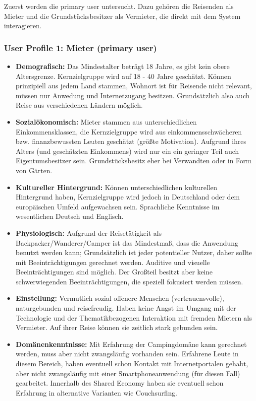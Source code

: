 Zuerst werden die primary user untersucht. Dazu gehören die Reisenden als Mieter und die Grundstücksbesitzer als Vermieter, die direkt mit dem System interagieren.

\newpage
\subsubsection{User Profile 1: Mieter (primary user)}
\begin{itemize}
   \item 
   \textbf{Demografisch:} Das Mindestalter beträgt 18 Jahre, es gibt kein obere Altersgrenze. Kernzielgruppe wird auf 18 - 40 Jahre geschätzt. Können prinzipiell aus jedem Land stammen, Wohnort ist für Reisende nicht relevant, müssen nur Anwedung und Internetzugang besitzen. Grundsätzlich also auch Reise aus verschiedenen Ländern möglich.

   \item 
  \textbf{Sozialökonomisch:} Mieter stammen aus unterschiedlichen Einkommensklassen, die Kernzielgruppe wird aus einkommensschwächeren bzw. finanzbewussten Leuten geschätzt (größte Motivation). 
   Aufgrund ihres Alters (und geschätzten Einkommens) wird nur ein ein geringer Teil auch Eigentumsbesitzer sein. Grundstücksbesitz eher bei Verwandten oder in Form von Gärten.

   \item 
   \textbf{Kultureller Hintergrund:} Können unterschiedlichen kulturellen Hintergrund haben, Kernzielgruppe wird jedoch in Deutschland oder dem europäischen Umfeld aufgewachsen sein. Sprachliche Kenntnisse im wesentlichen Deutsch und Englisch.

   \item
  \textbf{Physiologisch:} Aufgrund der Reisetätigkeit als Backpacker/Wanderer/Camper ist das Mindestmaß, dass die Anwendung benutzt werden kann; Grundsätzlich ist jeder potentieller Nutzer, daher sollte mit Beeinträchtigungen gerechnet werden. Auditive und visuelle Beeinträchtigungen sind möglich. Der Großteil besitzt aber keine schwerwiegenden Beeinträchtigungen, die speziell fokusiert werden müssen.

   \item 
   \textbf{Einstellung:} Vermutlich sozial offenere Menschen (vertrauensvolle), naturgebunden und reisefreudig. Haben keine Angst im Umgang mit der Technologie und der Thematikbezogenen Interaktion mit fremden Mietern als Vermieter. Auf ihrer Reise können sie zeitlich stark gebunden sein.

   \item 
  \textbf{Domänenkenntnisse:} Mit Erfahrung der Campingdomäne kann gerechnet werden, muss aber nicht zwangsläufig vorhanden sein.
   Erfahrene Leute in diesem Bereich, haben eventuell schon Kontakt mit Internetportalen gehabt, aber nicht zwangsläufig mit einer Smartphoneanwendung (für diesen Fall) gearbeitet.
   Innerhalb des Shared Economy haben sie eventuell schon Erfahrung in alternative Varianten wie Couchsurfing.


\end{itemize}
